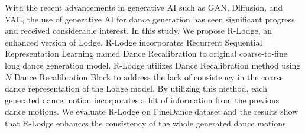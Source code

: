   With the recent advancements in generative AI such as GAN, Diffusion, and VAE, the use of generative AI for dance generation has seen significant progress and received considerable interest. In this study, We propose R-Lodge, an enhanced version of Lodge. R-Lodge incorporates  Recurrent Sequential Representation Learning named Dance Recalibration to original coarse-to-fine long dance generation model. R-Lodge utilizes Dance Recalibration method using \(N\) Dance Recalibration Block to address the lack of consistency in the coarse dance representation of the Lodge model. By utilizing this method, each generated dance motion incorporates a bit of information from the previous dance motions. We evaluate R-Lodge on FineDance dataset and the results show that R-Lodge enhances the consistency of the whole generated dance motions.